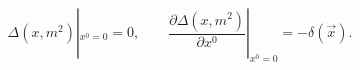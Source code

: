 \begin{equation}
\Delta(x,m^2)|_{x^0=0}=0,\qquad
\frac{\partial\Delta(x,m^2)}{\partial x^0} |_{x^0=0}=-\delta(\vec{x}).\label{ETC}
\end{equation}

